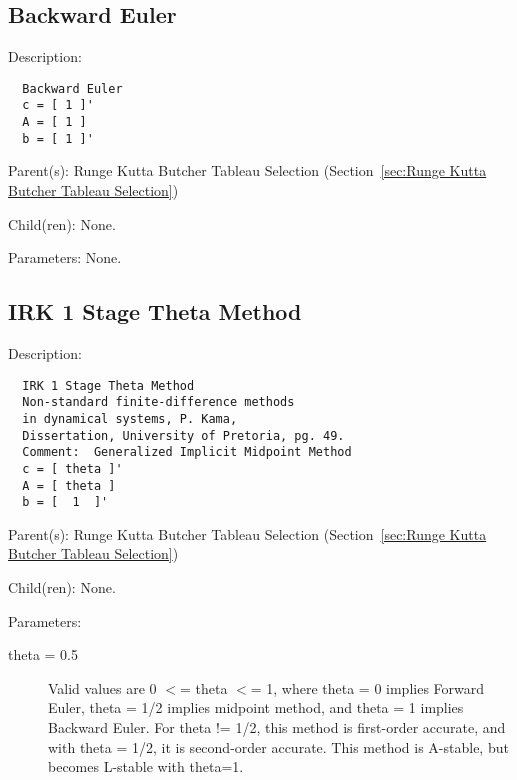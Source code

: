 \subsection{Backward Euler}
\label{sec:Backward Euler-Runge Kutta Butcher Tableau Selection}

\begin{list}{}
  {\setlength{\leftmargin}{1.0in}
   \setlength{\labelwidth}{0.75in}
   \setlength{\labelsep}{0.125in}}
  \item[Description:]
\begin{verbatim}
  Backward Euler
  c = [ 1 ]'
  A = [ 1 ]
  b = [ 1 ]'
\end{verbatim}
  \item[Parent(s):]
    Runge Kutta Butcher Tableau Selection (Section~\ref{sec:Runge Kutta Butcher Tableau Selection})
  \item[Child(ren):]
    None. 
  \item[Parameters:]
    None. 
\end{list}

\subsection{IRK 1 Stage Theta Method}
\label{sec:IRK 1 Stage Theta Method}

\begin{list}{}
  {\setlength{\leftmargin}{1.0in}
   \setlength{\labelwidth}{0.75in}
   \setlength{\labelsep}{0.125in}}
  \item[Description:]
\begin{verbatim}
  IRK 1 Stage Theta Method
  Non-standard finite-difference methods
  in dynamical systems, P. Kama,
  Dissertation, University of Pretoria, pg. 49.
  Comment:  Generalized Implicit Midpoint Method
  c = [ theta ]'
  A = [ theta ]
  b = [  1  ]'
\end{verbatim}
  \item[Parent(s):]
    Runge Kutta Butcher Tableau Selection (Section~\ref{sec:Runge Kutta Butcher Tableau Selection})
  \item[Child(ren):]
    None. 
  \item[Parameters:]
    \begin{description}
      \item[theta = 0.5] 
Valid values are 0 $<$= theta $<$= 1, where theta = 0 implies Forward Euler, theta = 1/2 implies midpoint method, and theta = 1 implies Backward Euler. For theta != 1/2, this method is first-order accurate, and with theta = 1/2, it is second-order accurate.  This method is A-stable, but becomes L-stable with theta=1.
\end{description}

\end{list}

